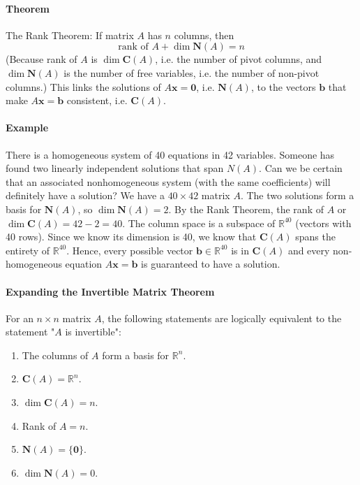 \documentclass[../linear-algebra.tex]{subfiles}
\begin{document}
\paragraph{Theorem} The Rank Theorem: If matrix $A$ has $n$ columns, then
$$\text{rank of } A + \dim \mathbf{N}(A) = n$$
(Because rank of $A$ is $\dim \mathbf{C}(A)$, i.e. the number of pivot columns, and $\dim \mathbf{N}(A)$ is the number of free variables, i.e. the number of non-pivot columns.)\newline
This links the solutions of $A\mathbf{x}=\mathbf{0}$, i.e. $\mathbf{N}(A)$, to the vectors $\mathbf{b}$ that make $A\mathbf{x}=\mathbf{b}$ consistent, i.e. $\mathbf{C}(A)$.
\paragraph{Example} There is a homogeneous system of 40 equations in 42 variables. Someone has found two linearly independent solutions that span $N(A)$. Can we be certain that an associated nonhomogeneous system (with the same coefficients) will definitely have a solution?\newline
We have a $40 \times 42$ matrix $A$. The two solutions form a basis for $\mathbf{N}(A)$, so $\dim \mathbf{N}(A) = 2$.\newline
By the Rank Theorem, the rank of $A$ or $\dim \mathbf{C}(A) = 42 - 2 = 40$.\newline
The column space is a subspace of $\mathbb{R}^{40}$ (vectors with 40 rows). Since we know its dimension is 40, we know that $\mathbf{C}(A)$ spans the entirety of $\mathbb{R}^{40}$.
Hence, every possible vector $\mathbf{b} \in \mathbb{R}^{40}$ is in $\mathbf{C}(A)$ and every non-homogeneous equation $A\mathbf{x} = \mathbf{b}$ is guaranteed to have a solution.
\paragraph{Expanding the Invertible Matrix Theorem}
For an $n \times n$ matrix $A$, the following statements are logically equivalent to the statement "$A$ is invertible":
\begin{enumerate}
    \item The columns of $A$ form a basis for $\mathbb{R}^{n}$.
    \item $\mathbf{C}(A) = \mathbb{R}^{n}$.
    \item $\dim \mathbf{C}(A) = n$.
    \item Rank of $A = n$.
    \item $\mathbf{N}(A) = \{\mathbf{0}\}$.
    \item $\dim \mathbf{N}(A) = 0$.
\end{enumerate}
\end{document}
